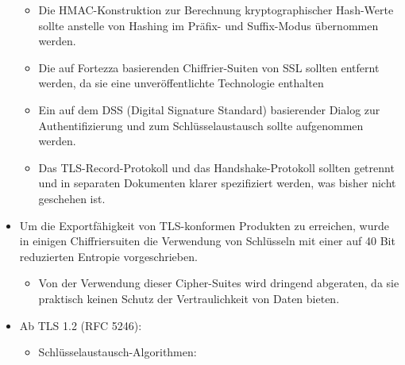 \documentclass[a4paper]{article}
\begin{document}
\begin{multicols}{3}
\begin{itemize}
              \begin{itemize}
                  \item
                        Die HMAC-Konstruktion zur Berechnung kryptographischer Hash-Werte
                        sollte anstelle von Hashing im Präfix- und Suffix-Modus übernommen
                        werden.
                  \item
                        Die auf Fortezza basierenden Chiffrier-Suiten von SSL sollten
                        entfernt werden, da sie eine unveröffentlichte Technologie enthalten
                  \item
                        Ein auf dem DSS (Digital Signature Standard) basierender Dialog zur
                        Authentifizierung und zum Schlüsselaustausch sollte aufgenommen
                        werden.
                  \item
                        Das TLS-Record-Protokoll und das Handshake-Protokoll sollten
                        getrennt und in separaten Dokumenten klarer spezifiziert werden, was
                        bisher nicht geschehen ist.
              \end{itemize}
        \item
              Um die Exportfähigkeit von TLS-konformen Produkten zu erreichen, wurde
              in einigen Chiffriersuiten die Verwendung von Schlüsseln mit einer auf
              40 Bit reduzierten Entropie vorgeschrieben.

              \begin{itemize}
                  \item
                        Von der Verwendung dieser Cipher-Suites wird dringend abgeraten, da
                        sie praktisch keinen Schutz der Vertraulichkeit von Daten bieten.
              \end{itemize}
        \item
              Ab TLS 1.2 (RFC 5246):

              \begin{itemize}
                  \item
                        Schlüsselaustausch-Algorithmen:


\end{itemize}
\end{itemize}
\end{multicols}
\end{document}

